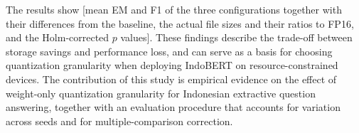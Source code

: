 \begin{singlespace}
The results show [mean EM and F1 of the three configurations together with their differences from the baseline, the actual file sizes and their ratios to FP16, and the Holm-corrected $p$ values]. These findings describe the trade-off between storage savings and performance loss, and can serve as a basis for choosing quantization granularity when deploying IndoBERT on resource-constrained devices. The contribution of this study is empirical evidence on the effect of weight-only quantization granularity for Indonesian extractive question answering, together with an evaluation procedure that accounts for variation across seeds and for multiple-comparison correction.

\end{singlespace}
\clearpage
